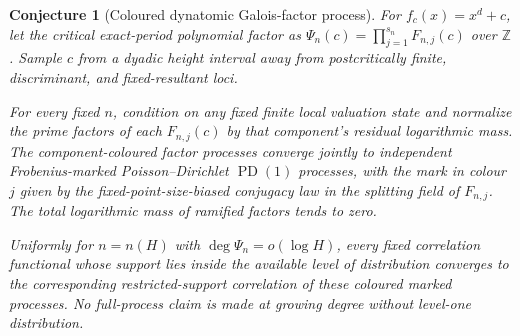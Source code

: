 \documentclass[11pt]{article}
\newtheorem{conjecture}{Conjecture}
\theoremstyle{definition}
\newcommand{\PD}{\operatorname{PD}}
\newcommand{\Z}{\mathbb Z}
\providecommand{\Z}{\mathbb Z}
\begin{document}
\begin{conjecture}[Coloured dynatomic Galois-factor process]\label{s18}
For $f_c(x)=x^d+c$, let the critical exact-period polynomial factor as
$\Psi_n(c)=\prod_{j=1}^{s_n}F_{n,j}(c)$ over $\Z$.  Sample $c$ from a dyadic height
interval away from postcritically finite, discriminant, and fixed-resultant loci.

For every fixed $n$, condition on any fixed finite local valuation state and normalize
the prime factors of each $F_{n,j}(c)$ by that component's residual logarithmic mass.
The component-coloured factor processes converge jointly to independent
Frobenius-marked Poisson--Dirichlet $\PD(1)$ processes, with the mark in colour $j$ given by the
fixed-point-size-biased conjugacy law in the splitting field of $F_{n,j}$.  The total
logarithmic mass of ramified factors tends to zero.

Uniformly for $n=n(H)$ with $\deg\Psi_n=o(\log H)$, every fixed correlation functional
whose support lies inside the available level of distribution converges to the
corresponding restricted-support correlation of these coloured marked processes.  No
full-process claim is made at growing degree without level-one distribution.
\end{conjecture}
\end{document}
